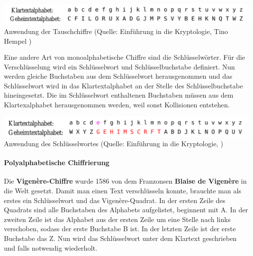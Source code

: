 \documentclass[12pt,a4paper]{report}
\begin{document}
\begin{onehalfspace}
\begin{center}
\includegraphics[scale=0.35]{img/tauschchiffre.png}\\
Anwendung der Tauschchiffre (Quelle: Einführung in die Kryptologie, Tino Hempel \cite{krypto01})
\end{center}

Eine andere Art von monoalphabetische Chiffre sind die Schlüsselwörter. Für die Verschlüsselung wird ein Schlüsselwort und Schlüsselbuchstabe definiert. Nun werden gleiche Buchstaben aus dem Schlüsselwort herausgenommen und das Schlüsselwort wird in das Klartextalphabet an der Stelle des Schlüsselbuchstabe hineingesetzt. Die im Schlüsselwort enthaltenen Buchstaben müssen aus dem Klartexalphabet herausgenommen werden, weil sonst Kollisionen entstehen.

\begin{center}
\includegraphics[scale=0.38]{img/schluesselwortes.png}\\
Anwendung des Schlüsselwortes (Quelle: Einführung in die Kryptologie, \cite{krypto01})
\end{center}

\newpage
\paragraph{Polyalphabetische Chiffrierung}

Die \textbf{Vigenère-Chiffre} wurde 1586 von dem Franzonsen \textbf{Blaise de Vigenère} in die Welt gesetzt. Damit man einen Text verschlüsseln konnte, brauchte man als erstes ein Schlüsselwort und das Vigenère-Quadrat. In der ersten Zeile des Quadrats sind alle Buchstaben des Alphabets aufgelistet, beginnent mit A. In der zweiten Zeile ist das Alphabet aus der ersten Zeile um eine Stelle nach links verschoben, sodass der erste Buchstabe B ist. In der letzten Zeile ist der erste Buchstabe das Z. Nun wird das Schlüsselwort unter dem Klartext geschrieben und falls notwendig wiederholt.\\


\end{onehalfspace}
\end{document}
